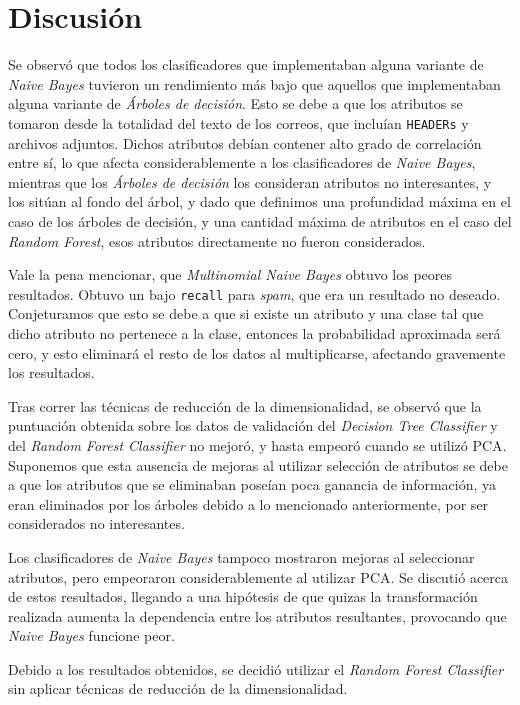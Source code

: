 \section{Discusión}


Se observ\'o que todos los clasificadores que implementaban alguna variante de \emph{Naive Bayes} tuvieron un rendimiento m\'as bajo que aquellos que implementaban alguna variante de \emph{\'Arboles de decisi\'on}. Esto se debe a que los atributos se tomaron desde la totalidad del texto de los correos, que inclu\'ian \texttt{HEADERs} y archivos adjuntos. Dichos atributos deb\'ian contener alto grado de correlaci\'on entre s\'i, lo que afecta considerablemente a los clasificadores de \emph{Naive Bayes}, mientras que los \emph{\'Arboles de decisi\'on} los consideran atributos no interesantes, y los sit\'uan al fondo del \'arbol, y dado que definimos una profundidad m\'axima en el caso de los \'arboles de decisi\'on, y una cantidad m\'axima de atributos en el caso del \emph{Random Forest}, esos atributos directamente no fueron considerados.

Vale la pena mencionar, que \emph{Multinomial Naive Bayes} obtuvo los peores resultados. Obtuvo un bajo \texttt{recall} para \emph{spam}, que era un resultado no deseado. Conjeturamos que esto se debe a que si existe un atributo y una clase tal que dicho atributo no pertenece a la clase, entonces la probabilidad aproximada ser\'a cero, y esto eliminar\'a el resto de los datos al multiplicarse\textsuperscript{\cite{multiproblem}}, afectando gravemente los resultados.


Tras correr las t\'ecnicas de reducci\'on de la dimensionalidad, se observ\'o que la puntuaci\'on obtenida sobre los datos de validaci\'on del \emph{Decision Tree Classifier} y del \emph{Random Forest Classifier} no mejor\'o, y hasta empeor\'o cuando se utiliz\'o PCA. Suponemos que esta ausencia de mejoras al utilizar selecci\'on de atributos se debe a que los atributos que se eliminaban pose\'ian poca ganancia de informaci\'on, ya eran eliminados por los \'arboles debido a lo mencionado anteriormente, por ser considerados no interesantes.

Los clasificadores de \emph{Naive Bayes} tampoco mostraron mejoras al seleccionar atributos, pero empeoraron considerablemente al utilizar PCA. Se discuti\'o acerca de estos resultados, llegando a una hip\'otesis de que quizas la transformaci\'on realizada aumenta la dependencia entre los atributos resultantes, provocando que \emph{Naive Bayes} funcione peor.



Debido a los resultados obtenidos, se decidi\'o utilizar el \emph{Random Forest Classifier} sin aplicar t\'ecnicas de reducci\'on de la dimensionalidad.
